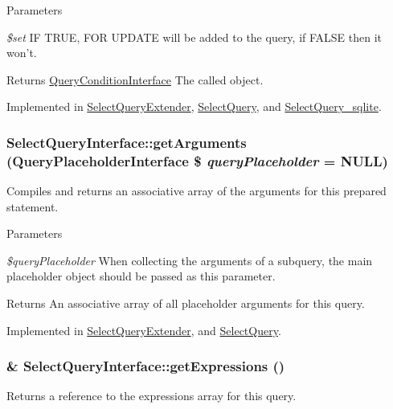 \begin{DoxyParams}{Parameters}
\item[{\em \$set}]IF TRUE, FOR UPDATE will be added to the query, if FALSE then it won't.\end{DoxyParams}
\begin{DoxyReturn}{Returns}
\hyperlink{interfaceQueryConditionInterface}{QueryConditionInterface} The called object. 
\end{DoxyReturn}


Implemented in \hyperlink{classSelectQueryExtender_a90e930c3ee67a055b81f7f31b18ba84e}{SelectQueryExtender}, \hyperlink{classSelectQuery_a44a1776379e738445712e196957e02b4}{SelectQuery}, and \hyperlink{classSelectQuery__sqlite_ad217a519ab7b84ce58b3e0e48b9bb943}{SelectQuery\_\-sqlite}.\hypertarget{interfaceSelectQueryInterface_ae033466efee1ce7d14b64f1d6b23e4a2}{
\subsubsection[{getArguments}]{\setlength{\rightskip}{0pt plus 5cm}SelectQueryInterface::getArguments ({\bf QueryPlaceholderInterface} \$ {\em queryPlaceholder} = {\ttfamily NULL})}}
\label{interfaceSelectQueryInterface_ae033466efee1ce7d14b64f1d6b23e4a2}
Compiles and returns an associative array of the arguments for this prepared statement.


\begin{DoxyParams}{Parameters}
\item[{\em \$queryPlaceholder}]When collecting the arguments of a subquery, the main placeholder object should be passed as this parameter.\end{DoxyParams}
\begin{DoxyReturn}{Returns}
An associative array of all placeholder arguments for this query. 
\end{DoxyReturn}


Implemented in \hyperlink{classSelectQueryExtender_a698c3d294496989368d02e5084c27f7e}{SelectQueryExtender}, and \hyperlink{classSelectQuery_a178ae347a7c736ac39fb5a25fb8b3783}{SelectQuery}.\hypertarget{interfaceSelectQueryInterface_a80eae8260f7ae7d3d782573f7030d96d}{
\subsubsection[{getExpressions}]{\setlength{\rightskip}{0pt plus 5cm}\& SelectQueryInterface::getExpressions ()}}
\label{interfaceSelectQueryInterface_a80eae8260f7ae7d3d782573f7030d96d}
Returns a reference to the expressions array for this query.

